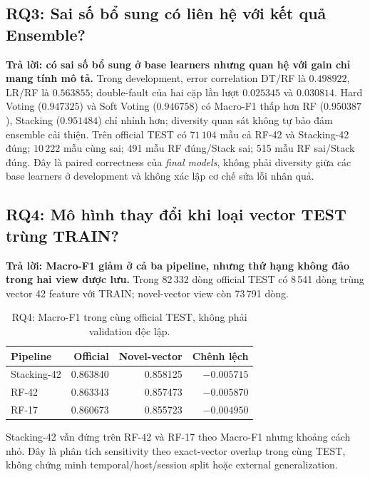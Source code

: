 \subsection{RQ3: Sai số bổ sung có liên hệ với kết quả Ensemble?}
\label{sec:revision-rq3}
\textbf{Trả lời: có sai số bổ sung ở base learners nhưng quan hệ với gain chỉ mang tính mô tả.}
Trong development, error correlation DT/RF là $0.498922$, LR/RF là $0.563855$; double-fault của hai cặp lần lượt $0.025345$ và $0.030814$. Hard Voting ($0.947325$) và Soft Voting ($0.946758$) có Macro-F1 thấp hơn RF ($0.950387$), Stacking ($0.951484$) chỉ nhỉnh hơn; diversity quan sát không tự bảo đảm ensemble cải thiện.
Trên official TEST có $71\,104$ mẫu cả RF-42 và Stacking-42 đúng; $10\,222$ mẫu cùng sai; 491 mẫu RF đúng/Stack sai; 515 mẫu RF sai/Stack đúng. Đây là paired correctness của \emph{final models}, không phải diversity giữa các base learners ở development và không xác lập cơ chế sửa lỗi nhân quả.

\subsection{RQ4: Mô hình thay đổi khi loại vector TEST trùng TRAIN?}
\label{sec:revision-rq4}
\textbf{Trả lời: Macro-F1 giảm ở cả ba pipeline, nhưng thứ hạng không đảo trong hai view được lưu.}
Trong 82\,332 dòng official TEST có 8\,541 dòng trùng vector 42 feature với TRAIN; novel-vector view còn 73\,791 dòng.
\begin{table}[H]\centering\small
\caption{RQ4: Macro-F1 trong cùng official TEST, không phải validation độc lập.}
\label{tab:rev-rq4}
\begin{tabular}{lrrr}\toprule
Pipeline & Official & Novel-vector & Chênh lệch\\\midrule
Stacking-42 & 0.863840 & 0.858125 & $-0.005715$\\
RF-42 & 0.863343 & 0.857473 & $-0.005870$\\
RF-17 & 0.860673 & 0.855723 & $-0.004950$\\\bottomrule
\end{tabular}
\end{table}
Stacking-42 vẫn đứng trên RF-42 và RF-17 theo Macro-F1 nhưng khoảng cách nhỏ. Đây là phân tích sensitivity theo exact-vector overlap trong cùng TEST, không chứng minh temporal/host/session split hoặc external generalization.

